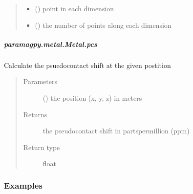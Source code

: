 \documentclass[a4paper,10pt,english,openany,oneside]{sphinxmanual}
\begin{document}
\begin{fulllineitems}
\begin{fulllineitems}
\begin{fulllineitems}
\begin{quote}
\begin{description}
\begin{itemize}
\item {} 
\sphinxAtStartPar
{} () \textendash{} point in each dimension

\item {} 
\sphinxAtStartPar
{} () \textendash{} the number of points along each dimension

\end{itemize}


\end{description}\end{quote}

\end{fulllineitems}



\subparagraph{paramagpy.metal.Metal.pcs}
\label{\detokenize{reference/generated/paramagpy.metal.Metal.pcs:paramagpy-metal-metal-pcs}}\label{\detokenize{reference/generated/paramagpy.metal.Metal.pcs::doc}}

\begin{fulllineitems}
\label{\detokenize{reference/generated/paramagpy.metal.Metal.pcs:paramagpy.metal.Metal.pcs}}
\sphinxAtStartPar
Calculate the psuedo\sphinxhyphen{}contact shift at the given postition
\begin{quote}\begin{description}
\item[{Parameters}] \leavevmode
\sphinxAtStartPar
{} () \textendash{} the position (x, y, z) in meters

\item[{Returns}] \leavevmode
\sphinxAtStartPar
{} \textendash{} the pseudo\sphinxhyphen{}contact shift in parts\sphinxhyphen{}per\sphinxhyphen{}million (ppm)

\item[{Return type}] \leavevmode
\sphinxAtStartPar
float

\end{description}\end{quote}
\subsubsection*{Examples}


\end{fulllineitems}
\end{fulllineitems}
\end{fulllineitems}
\end{document}

